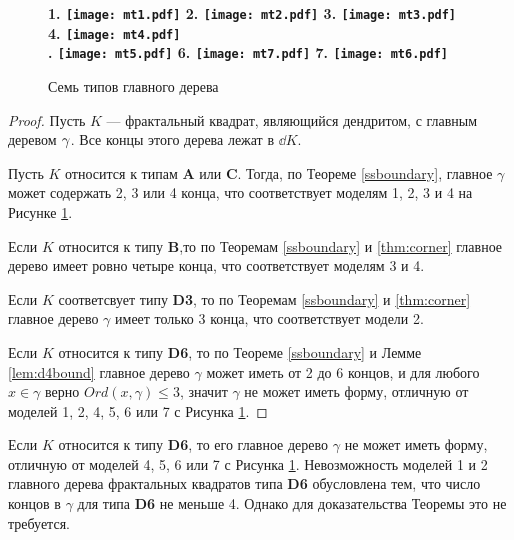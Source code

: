 \begin{figure}[H]
    \centering \Large {\bf
    1. \texttt{[image: mt1.pdf]}
    \hfill
    2. \texttt{[image: mt2.pdf]}
    \hfill
    3. \texttt{[image: mt3.pdf]}
    \hfill
    4. \texttt{[image: mt4.pdf]}\\
    . \texttt{[image: mt5.pdf]}
    \hfill
    6. \texttt{[image: mt7.pdf]}
    \hfill
    7. \texttt{[image: mt6.pdf]}}
    \caption{Семь типов главного дерева}
    \label{fig:7trees}
\end{figure}



\begin{proof}
Пусть $K$ --- фрактальный квадрат, являющийся дендритом, с главным деревом $\gamma$. 
Все концы этого дерева лежат в $\dd K$.

Пусть $K$ относится к типам {\bf A} или {\bf C}. 
Тогда, по Теореме \ref{ssboundary}, главное $\gamma$ может содержать 2, 3 или 4 конца, что соответствует моделям 1, 2, 3 и 4 на Рисунке \ref{fig:7trees}.


Если $K$ относится к типу {\bf B},то по Теоремам \ref{ssboundary} и \ref{thm:corner} главное дерево имеет ровно четыре конца, что соответствует моделям 3 и 4.

Если $K$ соответсвует типу {\bf D3}, то по Теоремам \ref{ssboundary} и \ref{thm:corner} главное дерево $\gamma$ имеет только 3 конца, что соответствует модели 2.

Если $K$ относится к типу {\bf D6}, то по Теореме \ref{ssboundary} и Лемме \ref{lem:d4bound} главное дерево $\gamma$ может иметь от 2 до 6 концов, и для любого  $x\in \gamma $ верно $ Ord(x,\gamma)\leq3$, значит $\gamma$ не может иметь форму, отличную от моделей 1, 2, 4, 5, 6 или 7 с Рисунка \ref{fig:7trees}.
\end{proof}

\begin{remark}
Если $K$ относится к типу {\bf D6}, то его главное дерево $\gamma$ не может иметь форму, отличную от моделей 4, 5, 6 или 7 с Рисунка \ref{fig:7trees}.
Невозможность моделей 1 и 2 главного дерева фрактальных квадратов типа {\bf D6} обусловлена тем, что число концов в $\gamma$ для типа {\bf D6} не меньше 4.
Однако для доказательства Теоремы \label{thm:7trees} это не требуется.
\end{remark}

